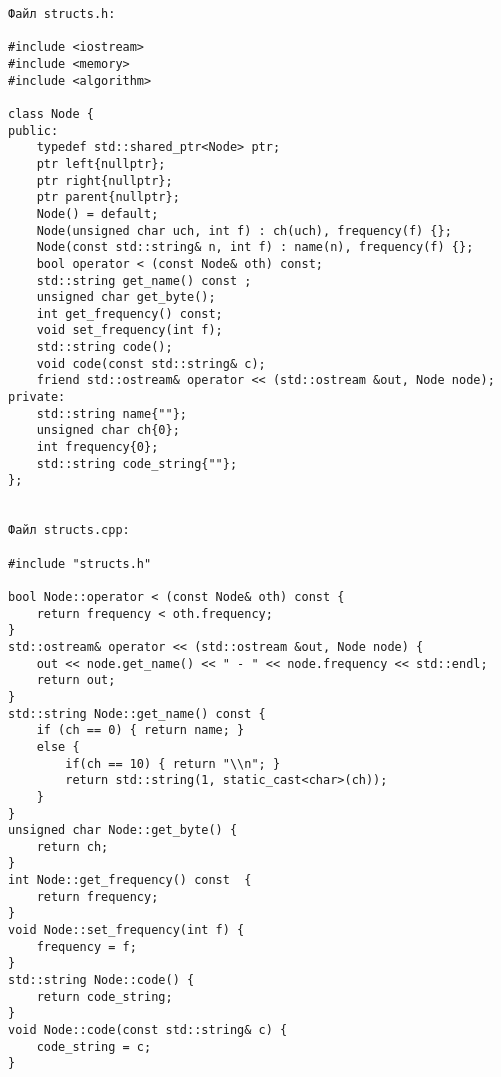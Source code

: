 \begin{verbatim}
Файл structs.h:

#include <iostream>
#include <memory>
#include <algorithm>
	
class Node {
public:
    typedef std::shared_ptr<Node> ptr;
    ptr left{nullptr};
    ptr right{nullptr};
    ptr parent{nullptr};
    Node() = default;
    Node(unsigned char uch, int f) : ch(uch), frequency(f) {};
    Node(const std::string& n, int f) : name(n), frequency(f) {};
    bool operator < (const Node& oth) const;
    std::string get_name() const ;
    unsigned char get_byte();
    int get_frequency() const;
    void set_frequency(int f);
    std::string code();
    void code(const std::string& c);
    friend std::ostream& operator << (std::ostream &out, Node node);
private:
    std::string name{""};
    unsigned char ch{0};
    int frequency{0};
    std::string code_string{""};
};


Файл structs.cpp:

#include "structs.h"

bool Node::operator < (const Node& oth) const {
    return frequency < oth.frequency;
}
std::ostream& operator << (std::ostream &out, Node node) {
    out << node.get_name() << " - " << node.frequency << std::endl;
    return out;
}
std::string Node::get_name() const {
    if (ch == 0) { return name; }
    else {
        if(ch == 10) { return "\\n"; }
        return std::string(1, static_cast<char>(ch));
    }
}
unsigned char Node::get_byte() {
    return ch;
}
int Node::get_frequency() const  {
    return frequency;
}
void Node::set_frequency(int f) {
    frequency = f;
}
std::string Node::code() {
    return code_string;
}
void Node::code(const std::string& c) {
    code_string = c;
}
\end{verbatim}

